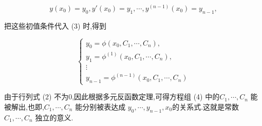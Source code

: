 \documentclass[a4paper]{article}
\begin{document}
$$ {\displaystyle y(x_0)=y_0,y'(x_0)=y_1,\cdots,y^{(n-1)}(x_0)=y_{n-1}, }$$

把这些初值条件代入 (3) 时,得到 

\begin{equation} {\displaystyle \begin{cases} y_0=\phi(x_0,C_1,\cdots,C_n),\\ y_1=\phi^{(1)}(x_0,C_1,\cdots,C_n),\\ \vdots\\ y_{n-1}=\phi^{(n-1)}(x_0,C_1,\cdots,C_n) \end{cases} }\end{equation}

 由于行列式 (2) 不为0,因此根据多元反函数定理,可得方程组 (4) 中的$ C_1,\cdots,C_n$ 能被解出,也即,$ C_1,\cdots,C_n$ 能分别被表达成 $ y_0,\cdots,y_{n-1},x_0$的关系式.这就是常数 $ C_1,\cdots,C_n$ 独立的意义.
\end{document}
